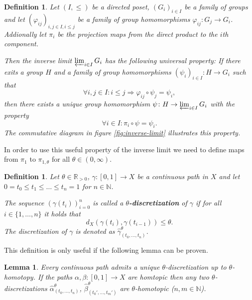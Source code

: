 \documentclass[a4paper, 11pt, twoside]{article}
\newcommand{\R}[0]{\mathbb{R}}
\newcommand{\N}[0]{\mathbb{N}}
\theoremstyle{break}
\theoremstyle{break}
\newtheorem{defin}[thm]{Definition}
\newtheorem{lemma}[thm]{Lemma}
\begin{document}
\begin{defin}
  Let $(I, \leq)$ be a directed poset, $(G_i)_{i\in I}$ be a family of groups and let $(\varphi_{ij})_{i,j \in I, i \leq j}$ be a family of group homomorphisms $\varphi_{ij} \colon G_j \to G_i$.
  Addionally let $\pi_i$ be the projection maps from the direct product to the $i$th component.
  
  Then the inverse limit $\varprojlim_{i\in I} G_i$ has the following universal property:
  If there exits a group $H$ and a family of group homomorphisms $(\psi_i)_{i\in I}\colon H \to G_i$ such that 
  \begin{equation*}
    \forall i,j \in I\colon i \leq j \Rightarrow \varphi_{ij} \circ \psi_j = \psi_i,
  \end{equation*}
  then there exists a unique group homomorphism $\psi\colon H \to \varprojlim_{i\in I} G_i$ with the property
  \begin{equation*}
    \forall i \in I\colon \pi_i \circ \psi = \psi_i.
  \end{equation*}
  The commutative diagram in figure \ref{fig:inverse-limit} illustrates this property.
\end{defin}

In order to use this useful property of the inverse limit we need to define maps from $\pi_1$ to $\pi_{1,\theta}$ for all $\theta \in (0,\infty)$. 
\begin{defin}
  Let $\theta \in \R_{>0}$, $\gamma\colon [0,1] \to X$ be a continuous path in $X$ and let $0 = t_0 \leq t_1 \leq \ldots \leq t_n = 1$ for $n \in \N$.

  The sequence $(\gamma(t_i))_{i=0}^n$ is called a \textbf{$\theta$-discretization} of $\gamma$ if for all $i \in \{1, \ldots, n\}$ it holds that
  \begin{equation*}
    d_X(\gamma(t_{i}), \gamma(t_{i-1})) \leq \theta.
  \end{equation*}
  The discretization of $\gamma$ is denoted as $\widehat{\gamma}^{\theta}_{(t_0, \ldots, t_n)}$.
\end{defin}

This definition is only useful if the following lemma can be proven.

\begin{lemma}\label{lem:discretization}
  Every continuous path admits a unique $\theta$-discretization up to $\theta$-homotopy. If the paths $\alpha, \beta\colon [0,1] \to X$ are homtopic then any two $\theta$-discretizations 
  $\widehat{\alpha}^{\theta}_{(t_0, \ldots, t_n)}$, $\widehat{\beta}^{\theta}_{(t_0', \ldots, t_m')}$ are $\theta$-homotopic ($n,m \in \N$).
\end{lemma}
\end{document}
